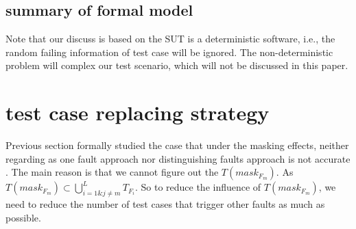 \documentclass{sig-alternate}
\begin{document}
%
%
%
%
%
\subsection{summary of formal model}
Note that our discuss is based on the SUT is a deterministic software, i.e., the random failing information of test case will be ignored. The non-deterministic problem will complex our test scenario, which will not be discussed in this paper.


\section{test case replacing strategy}
Previous section formally studied the case that under the masking effects, neither regarding as one fault approach nor distinguishing faults approach is not accurate . The main reason is that we cannot figure out the $T(mask_{F_{m}})$.  As $T(mask_{F_{m}}) \subset \bigcup_{i = 1 \& j \neq m }^{L}T_{F_{i}}$. So to reduce the influence of $T(mask_{F_{m}})$, we need to reduce the number of test cases that trigger other faults as much as possible.
\end{document}
